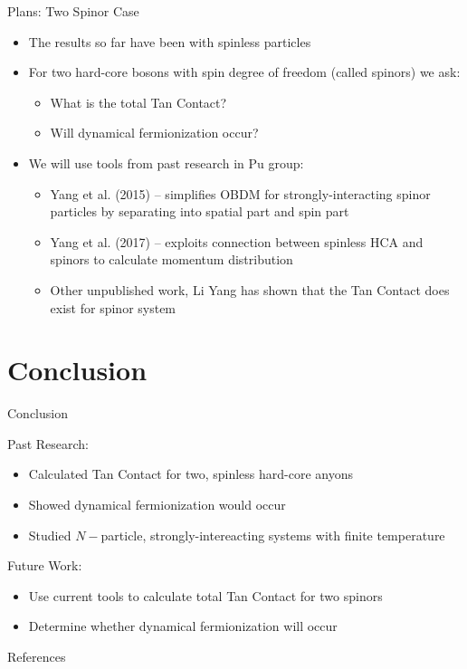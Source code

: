\documentclass[12pt, usenames, dvipsnames]{beamer}
\begin{document}

\begin{frame}[t]{Plans: Two Spinor Case}

\begin{itemize}
\item The results so far have been with spinless particles
\item For two hard-core bosons with spin degree of freedom (called spinors) we ask:
	\begin{itemize}
	\item What is the total Tan Contact?
	\item Will dynamical fermionization occur?
	\end{itemize}
\item We will use tools from past research in Pu group:

	\begin{itemize}
	\item Yang et al. (2015) -- simplifies OBDM for strongly-interacting spinor particles by separating into spatial part and spin part
	\item Yang et al. (2017) -- exploits connection between spinless HCA and spinors to calculate momentum distribution
	\item Other unpublished work, Li Yang has shown that the Tan Contact does exist for spinor system
	\end{itemize}

\end{itemize}

\end{frame}

\section{Conclusion}


\begin{frame}[t]{Conclusion}

\begin{block}{Past Research:}

\begin{itemize}
\item Calculated Tan Contact for two, spinless hard-core anyons
\item Showed dynamical fermionization would occur
\item Studied $N-$particle, strongly-intereacting systems with finite temperature
\end{itemize}

\end{block}

\begin{block}{Future Work:}
\begin{itemize}
\item Use current tools to calculate total Tan Contact for two spinors
\item Determine whether dynamical fermionization will occur
\end{itemize}
\end{block}


\end{frame}

\begin{frame}[shrink=30]{References}
\nocite{*}



\end{frame}
\end{document}
